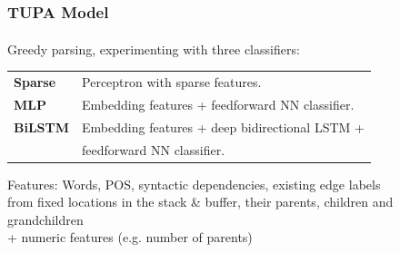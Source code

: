 \documentclass[t]{beamer}
\newcommand{\parser}[1]{TUPA\textsubscript{#1}}
\begin{document}
\begin{frame}
\frametitle{\parser{} Model}
Greedy parsing, experimenting with three classifiers:
\begin{flushleft}
	\begin{tabular}{ll}
	\textbf{Sparse} & Perceptron with sparse features. \\
	\textbf{MLP} & Embedding features + feedforward NN classifier. \\
	\textbf{BiLSTM} & Embedding features + deep bidirectional LSTM + \\
	  & feedforward NN classifier.
	\end{tabular}
	\vfill
	Features:
	Words, POS, syntactic dependencies, existing edge labels \\
	from fixed locations in the stack \& buffer, their parents, children and grandchildren \\
	+ numeric features (e.g. number of parents)
\end{flushleft}
\end{frame}
\end{document}

